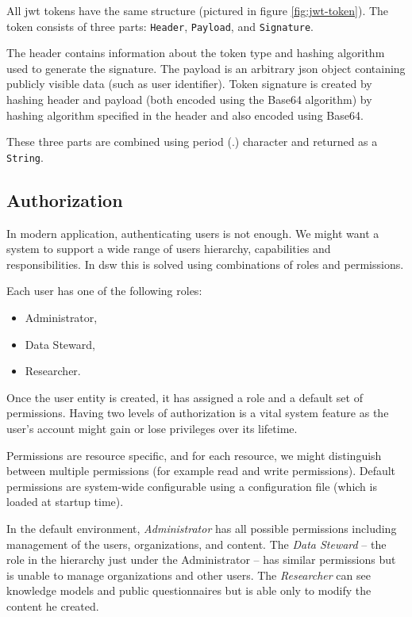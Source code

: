 All \gls{jwt} tokens have the same structure (pictured in figure \ref{fig:jwt-token}).
The token consists of three parts: \texttt{Header}, \texttt{Payload}, and \texttt{Signature}\cite{jwt-intro}.


The header contains information about the token type and hashing algorithm used to generate the signature.
The payload is an arbitrary \gls{json} object containing publicly visible data (such as user identifier).
Token signature is created by hashing header and payload (both encoded using the Base64 algorithm) by hashing algorithm specified in the header and also encoded using Base64.

These three parts are combined using period (.) character and returned as a \texttt{String}.

\subsection{Authorization}

In modern application, authenticating users is not enough.
We might want a system to support a wide range of users hierarchy, capabilities and responsibilities.
In \gls{dsw} this is solved using combinations of roles and permissions.

Each user has one of the following roles:

\begin{itemize}
    \item Administrator,
    \item Data Steward,
    \item Researcher.
\end{itemize}

Once the user entity is created, it has assigned a role and a default set of permissions.
Having two levels of authorization is a vital system feature as the user's account might gain or lose privileges over its lifetime.

Permissions are resource specific, and for each resource, we might distinguish between multiple permissions (for example read and write permissions).
Default permissions are system-wide configurable using a configuration file (which is loaded at startup time).

In the default environment, \textit{Administrator} has all possible permissions including management of the users, organizations, and content.
The \textit{Data Steward} -- the role in the hierarchy just under the Administrator -- has similar permissions but is unable to manage organizations and other users.
The \textit{Researcher} can see knowledge models and public questionnaires but is able only to modify the content he created.

